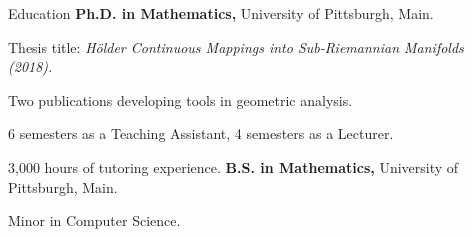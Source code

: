 \begin{rubric}{Education}
%
	\textbf{Ph.D. in Mathematics,} University of Pittsburgh, Main.
	\par Thesis title: \emph{Hölder Continuous Mappings into Sub-Riemannian Manifolds (2018).}
	\par Two publications developing tools in geometric analysis.
	\par 6 semesters as a Teaching Assistant, 4 semesters as a Lecturer.
	\par 3,000 hours of tutoring experience.
%
%
	\textbf{B.S. in Mathematics,} University of Pittsburgh, Main.\par
	Minor in Computer Science.
\end{rubric}
